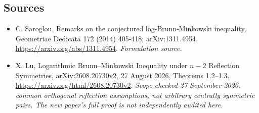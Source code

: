\documentclass[11pt]{article}
\begin{document}
\subsection{Sources}
\begin{itemize}
\item[S1]C. Saroglou, Remarks on the conjectured log-Brunn-Minkowski inequality, Geometriae Dedicata 172 (2014) 405-418; arXiv:1311.4954.
\url{https://arxiv.org/abs/1311.4954}.
\textit{Formulation source.}
\item[E1]X. Lu, Logarithmic Brunn--Minkowski Inequality under $n-2$ Reflection Symmetries, arXiv:2608.20730v2, 27 August 2026, Theorems 1.2--1.3.
\url{https://arxiv.org/html/2608.20730v2}.
\textit{Scope checked 27 September 2026: common orthogonal reflection assumptions, not arbitrary centrally symmetric pairs. The new paper's full proof is not independently audited here.}
\end{itemize}
\end{document}
